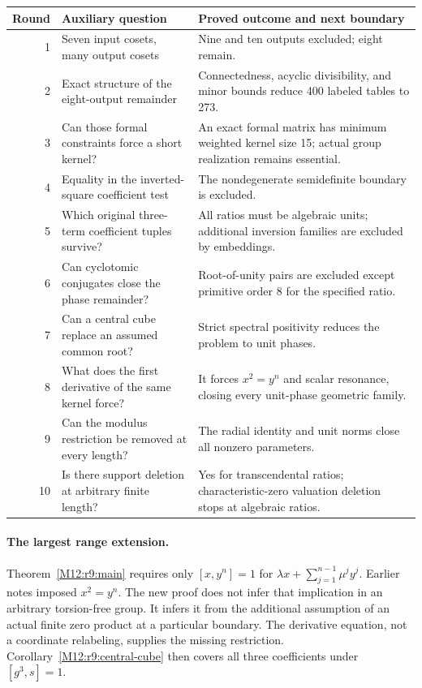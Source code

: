 \documentclass[11pt,a4paper,oneside]{report}
\theoremstyle{definition}
\theoremstyle{remark}
\begin{document}
\begin{center}
\small
\begin{tabular}{@{}r>{\raggedright\arraybackslash}p{.39\linewidth}
 >{\raggedright\arraybackslash}p{.46\linewidth}@{}}
\toprule
Round & Auxiliary question & Proved outcome and next boundary\\
\midrule
1 & Seven input cosets, many output cosets &
Nine and ten outputs excluded; eight remain.\\[3pt]
2 & Exact structure of the eight-output remainder &
Connectedness, acyclic divisibility, and minor bounds reduce
400 labeled tables to 273.\\[3pt]
3 & Can those formal constraints force a short kernel? &
An exact formal matrix has minimum weighted kernel size 15;
actual group realization remains essential.\\[3pt]
4 & Equality in the inverted-square coefficient test &
The nondegenerate semidefinite boundary is excluded.\\[3pt]
5 & Which original three-term coefficient tuples survive? &
All ratios must be algebraic units; additional inversion families
are excluded by embeddings.\\[3pt]
6 & Can cyclotomic conjugates close the phase remainder? &
Root-of-unity pairs are excluded except primitive order 8
for the specified ratio.\\[3pt]
7 & Can a central cube replace an assumed common root? &
Strict spectral positivity reduces the problem to unit phases.\\[3pt]
8 & What does the first derivative of the same kernel force? &
It forces $x^2=y^n$ and scalar resonance, closing every
unit-phase geometric family.\\[3pt]
9 & Can the modulus restriction be removed at every length? &
The radial identity and unit norms close all nonzero parameters.\\[3pt]
10 & Is there support deletion at arbitrary finite length? &
Yes for transcendental ratios; characteristic-zero valuation
deletion stops at algebraic ratios.\\
\bottomrule
\end{tabular}
\end{center}

\paragraph{The largest range extension.}
Theorem~\ref{M12:r9:main} requires only $[x,y^n]=1$ for
$\lambda x+\sum_{j=1}^{n-1}\mu^j y^j$. Earlier notes imposed
$x^2=y^n$. The new proof does not infer that implication in an
arbitrary torsion-free group. It infers it from the additional
assumption of an actual finite zero product at a particular boundary.
The derivative equation, not a coordinate relabeling, supplies the
missing restriction. Corollary~\ref{M12:r9:central-cube} then covers
all three coefficients under $[g^3,s]=1$.
\end{document}

